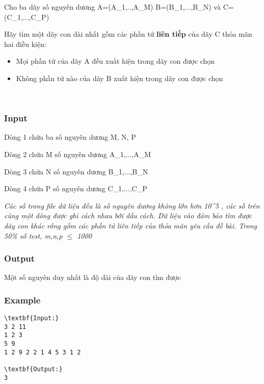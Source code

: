 

Cho ba dãy số nguyên dương A=(A\_1,..,A\_M) B=(B\_1,...,B\_N) và C=(C\_1,...,C\_P)

Hãy tìm một dãy con dài nhất gồm các phần tử \textbf{ liên tiếp } của dãy C thỏa mãn hai điều kiện:
\begin{itemize}
	\item Mọi phần tử của dãy A đều xuất hiện trong dãy con được chọn
	\item Không phần tử nào của dãy B xuất hiện trong dãy con được chọn
\end{itemize}

 

\subsubsection{Input}

Dòng 1 chứa ba số nguyên dương M, N, P

Dòng 2 chứa M số nguyên dương A\_1,...,A\_M

Dòng 3 chứa N số nguyên dương B\_1,...,B\_N

Dòng 4 chứa P số nguyên dương C\_1,...,C\_P

\emph{Các số trong file dữ liệu đều là số nguyên dương không lớn hơn 10^5 }\emph{ , các số trên cùng một dòng được ghi cách nhau bởi dấu cách. Dữ liệu vào đảm bảo tìm được dãy con khác rỗng gồm các phần tử liên tiếp của }\emph{ thỏa mãn yêu cầu đề bài. Trong 50\% số test, m,n,p  $\le$  1000 }

\subsubsection{Output}

Một số nguyên duy nhất là độ dài của dãy con tìm được

\subsubsection{Example}
\begin{verbatim}
\textbf{Input:}
3 2 11
1 2 3
5 9
1 2 9 2 2 1 4 5 3 1 2

\textbf{Output:}
3\end{verbatim}
